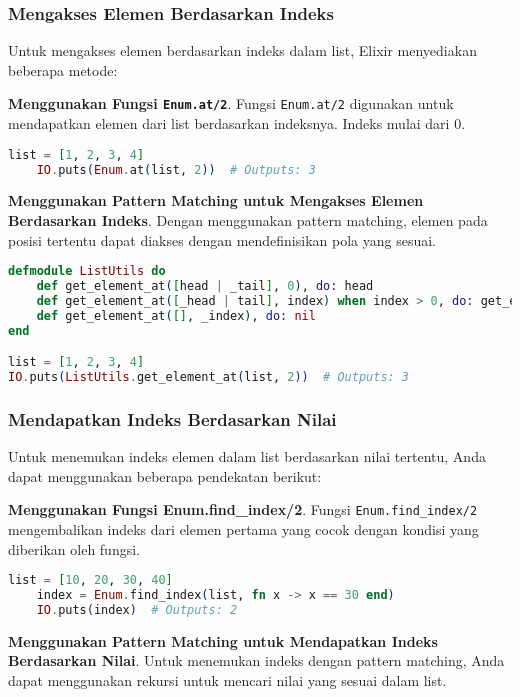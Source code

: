 \subsubsection{Mengakses Elemen Berdasarkan Indeks}
Untuk mengakses elemen berdasarkan indeks dalam list, Elixir menyediakan beberapa metode:

\textbf{Menggunakan Fungsi \texttt{Enum.at/2}}.
Fungsi \texttt{Enum.at/2} digunakan untuk mendapatkan elemen dari list berdasarkan indeksnya. Indeks mulai dari 0.

\begin{lstlisting}[language=Elixir]
	list = [1, 2, 3, 4]
	IO.puts(Enum.at(list, 2))  # Outputs: 3
\end{lstlisting}

\textbf{Menggunakan Pattern Matching untuk Mengakses Elemen Berdasarkan Indeks}.
Dengan menggunakan pattern matching, elemen pada posisi tertentu dapat diakses dengan mendefinisikan pola yang sesuai.

\begin{lstlisting}[language=Elixir]
defmodule ListUtils do
	def get_element_at([head | _tail], 0), do: head
	def get_element_at([_head | tail], index) when index > 0, do: get_element_at(tail, index - 1)
	def get_element_at([], _index), do: nil
end

list = [1, 2, 3, 4]
IO.puts(ListUtils.get_element_at(list, 2))  # Outputs: 3
\end{lstlisting}

\subsubsection{Mendapatkan Indeks Berdasarkan Nilai}
Untuk menemukan indeks elemen dalam list berdasarkan nilai tertentu, Anda dapat menggunakan beberapa pendekatan berikut:

\textbf{Menggunakan Fungsi Enum.find\_index/2}. 
Fungsi \texttt{Enum.find\_index/2} mengembalikan indeks dari elemen pertama yang cocok dengan kondisi yang diberikan oleh fungsi.

\begin{lstlisting}[language=Elixir]
	list = [10, 20, 30, 40]
	index = Enum.find_index(list, fn x -> x == 30 end)
	IO.puts(index)  # Outputs: 2
\end{lstlisting}

\textbf{Menggunakan Pattern Matching untuk Mendapatkan Indeks Berdasarkan Nilai}.
Untuk menemukan indeks dengan pattern matching, Anda dapat menggunakan rekursi untuk mencari nilai yang sesuai dalam list.


